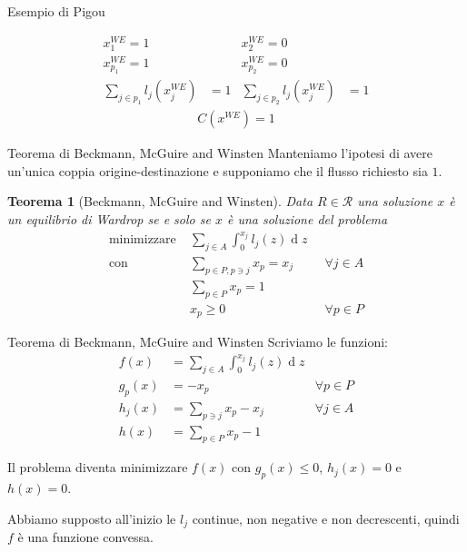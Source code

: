 \documentclass{beamer}
\newcounter{counter1}
\theoremstyle{plain}
\newtheorem{myteo}[counter1]{Teorema}
\theoremstyle{definition}
\theoremstyle{remark}
\newcommand{\pa}[1]{\left(#1\right)}
\DeclareMathOperator{\de}{d}
\begin{document}
\begin{frame}{Esempio di Pigou}
  \begin{center}
  \end{center}
  \begin{align*}
    x^{WE}_1 = 1 & & x^{WE}_2 = 0 & \\
    x^{WE}_{p_1} = 1 & & x^{WE}_{p_2} = 0 & \\
    \sum_{j\in p_1} l_j\pa{x^{WE}_j} &= 1 & \sum_{j\in p_2} l_j\pa{x^{WE}_j} &= 1
  \end{align*}
  \begin{align*}
    C\pa{x^{WE}} = 1
  \end{align*}
\end{frame}

\begin{frame}{Teorema di Beckmann, McGuire and Winsten}
  Manteniamo l'ipotesi di avere un'unica coppia origine-destinazione e
  supponiamo che il flusso richiesto sia $1$.
  \begin{myteo}[Beckmann, McGuire and Winsten]
    Data $R\in \mathcal{R}$ una soluzione $x$ è un equilibrio di
    Wardrop se e solo se $x$ è una soluzione del problema
    \begin{align*}
        \text{minimizzare} \;&  \sum _{j\in A} \int _0 ^ {x_j}
        l_j(z)\de z \\
        \text{con} \;& \sum _{p\in P, p\ni j} x_p = x_j&\;\; \forall j\in
        A\\
        & \sum _{p\in P} x_p = 1 \\
        & x_p \ge 0&\;\;\forall p\in P        
    \end{align*}
  \end{myteo}
\end{frame}

\begin{frame}{Teorema di Beckmann, McGuire and Winsten}
  Scriviamo le funzioni:
  \begin{align*}
    f(x) &= \sum _{j\in A} \int _0 ^ {x_j} l_j(z)\de z \\
    g_p(x) &= -x_p & \forall p\in P \\
    h_j(x) &= \sum _{p\ni j} x_p -x_j & \forall j\in A\\
    h(x) &= \sum _{p\in P} x_p -1
  \end{align*}
  
  Il problema diventa minimizzare $f(x)$ con $g_p(x) \le 0$, $h_j(x)
  =0$ e $h(x) =0$.

  Abbiamo supposto all'inizio le $l_j$ continue, non negative e non
  decrescenti, quindi $f$ è una funzione convessa.
\end{frame}
\end{document}
